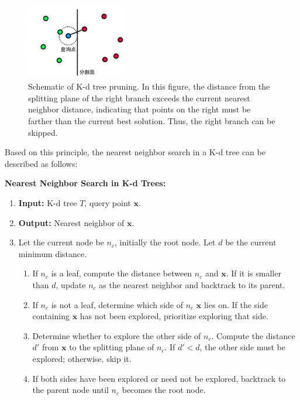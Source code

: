 \begin{figure}[!htp]
	\centering
	\includegraphics[width=0.4\textwidth]{resources/basic-point-cloud/kdtree-split-plane.pdf}
	\caption{Schematic of K-d tree pruning. In this figure, the distance from the splitting plane of the right branch exceeds the current nearest neighbor distance, indicating that points on the right must be farther than the current best solution. Thus, the right branch can be skipped.}
	\label{fig:kdtree-split-plane}
\end{figure}

Based on this principle, the nearest neighbor search in a K-d tree can be described as follows:

\begin{mdframed}
	\textbf{Nearest Neighbor Search in K-d Trees:}
	\begin{enumerate}
		\item \textbf{Input:} K-d tree \(T\), query point \(\bm{x}\).
		\item \textbf{Output:} Nearest neighbor of \(\bm{x}\).
		\item Let the current node be \(n_c\), initially the root node. Let \(d\) be the current minimum distance.
		\begin{enumerate}
			\item If \(n_c\) is a leaf, compute the distance between \(n_c\) and \(\bm{x}\). If it is smaller than \(d\), update \(n_c\) as the nearest neighbor and backtrack to its parent.
			\item If \(n_c\) is not a leaf, determine which side of \(n_c\) \(\bm{x}\) lies on. If the side containing \(\bm{x}\) has not been explored, prioritize exploring that side.
			\item Determine whether to explore the other side of \(n_c\). Compute the distance \(d'\) from \(\bm{x}\) to the splitting plane of \(n_c\). If \(d' < d\), the other side must be explored; otherwise, skip it.
			\item If both sides have been explored or need not be explored, backtrack to the parent node until \(n_c\) becomes the root node.
		\end{enumerate}
	\end{enumerate}
\end{mdframed}


